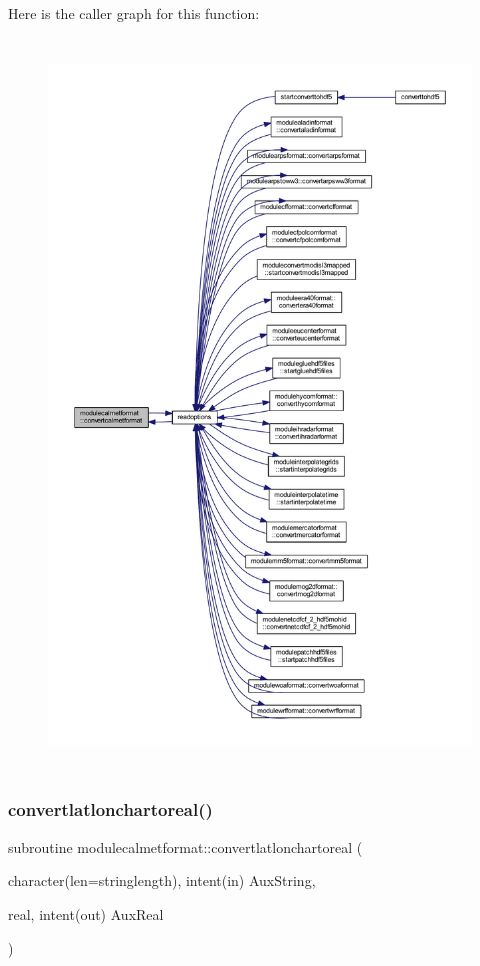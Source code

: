 Here is the caller graph for this function\+:\nopagebreak
\begin{figure}[H]
\begin{center}
\leavevmode
\includegraphics[height=550pt]{namespacemodulecalmetformat_a46e7b8dbd76c834dd87aa502fa427ecf_icgraph}
\end{center}
\end{figure}
\mbox{\label{namespacemodulecalmetformat_a4d48e68e591262be2fdee84257034418}} 
\subsubsection{\texorpdfstring{convertlatlonchartoreal()}{convertlatlonchartoreal()}}
{\footnotesize\ttfamily subroutine modulecalmetformat\+::convertlatlonchartoreal (\begin{DoxyParamCaption}\item[{character(len=stringlength), intent(in)}]{Aux\+String,  }\item[{real, intent(out)}]{Aux\+Real }\end{DoxyParamCaption})\hspace{0.3cm}{\ttfamily [private]}}

